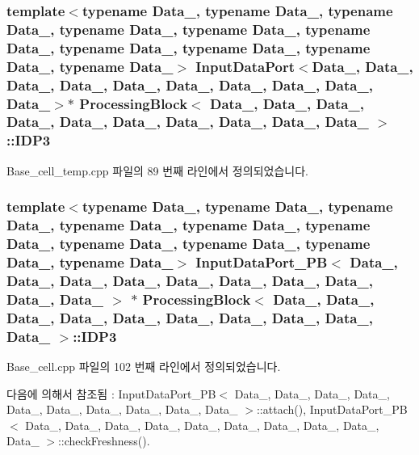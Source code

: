 \subsubsection[{\texorpdfstring{I\+D\+P3}{IDP3}}]{\setlength{\rightskip}{0pt plus 5cm}template$<$typename Data\+\_, typename Data\+\_, typename Data\+\_, typename Data\+\_, typename Data\+\_, typename Data\+\_, typename Data\+\_, typename Data\+\_, typename Data\+\_, typename Data\+\_$>$ {\bf Input\+Data\+Port}$<$Data\+\_, Data\+\_, Data\+\_, Data\+\_, Data\+\_, Data\+\_, Data\+\_, Data\+\_, Data\+\_, Data\+\_$>$$\ast$ {\bf Processing\+Block}$<$ Data\+\_, Data\+\_, Data\+\_, Data\+\_, Data\+\_, Data\+\_, Data\+\_, Data\+\_, Data\+\_, Data\+\_ $>$\+::I\+D\+P3}\hypertarget{classProcessingBlock_aa069c4cf51aec1b0b2887fea6f2fe1cb}{}\label{classProcessingBlock_aa069c4cf51aec1b0b2887fea6f2fe1cb}


Base\+\_\+cell\+\_\+temp.\+cpp 파일의 89 번째 라인에서 정의되었습니다.

\subsubsection[{\texorpdfstring{I\+D\+P3}{IDP3}}]{\setlength{\rightskip}{0pt plus 5cm}template$<$typename Data\+\_, typename Data\+\_, typename Data\+\_, typename Data\+\_, typename Data\+\_, typename Data\+\_, typename Data\+\_, typename Data\+\_, typename Data\+\_, typename Data\+\_$>$ {\bf Input\+Data\+Port\+\_\+\+PB}$<$ Data\+\_, Data\+\_, Data\+\_, Data\+\_, Data\+\_, Data\+\_, Data\+\_, Data\+\_, Data\+\_, Data\+\_ $>$ $\ast$ {\bf Processing\+Block}$<$ Data\+\_, Data\+\_, Data\+\_, Data\+\_, Data\+\_, Data\+\_, Data\+\_, Data\+\_, Data\+\_, Data\+\_ $>$\+::I\+D\+P3}\hypertarget{classProcessingBlock_a59b2c2ec3fc649ddcf47750cd029222e}{}\label{classProcessingBlock_a59b2c2ec3fc649ddcf47750cd029222e}


Base\+\_\+cell.\+cpp 파일의 102 번째 라인에서 정의되었습니다.



다음에 의해서 참조됨 \+:  Input\+Data\+Port\+\_\+\+P\+B$<$ Data\+\_, Data\+\_, Data\+\_, Data\+\_, Data\+\_, Data\+\_, Data\+\_, Data\+\_, Data\+\_, Data\+\_ $>$\+::attach(), Input\+Data\+Port\+\_\+\+P\+B$<$ Data\+\_, Data\+\_, Data\+\_, Data\+\_, Data\+\_, Data\+\_, Data\+\_, Data\+\_, Data\+\_, Data\+\_ $>$\+::check\+Freshness().

